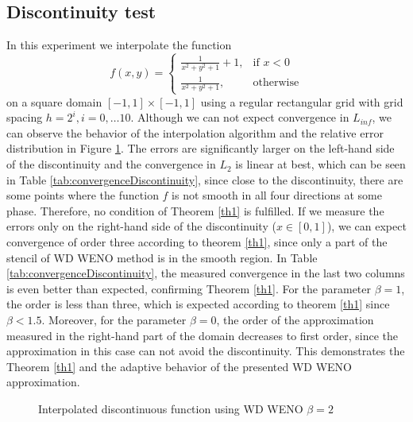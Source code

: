	\subsection{Discontinuity test}
 In this experiment we interpolate the function
 \begin{equation}
 	f(x,y)=
 	\begin{cases}
 		\frac{1}{x^2+y^2+1}+1,& \text{if } x < 0\\
 		\frac{1}{x^2+y^2+1}, & \text{otherwise}
 	\end{cases}
 \end{equation}
 on a square domain $[-1,1] \times [-1,1]$ using a regular rectangular grid with grid spacing $h=2^i, i=0,\ldots10$. Although we can not expect convergence in $L_{inf}$, we can observe the behavior of the interpolation algorithm and the relative error distribution in Figure \ref{figSurface}. The errors are significantly larger on the left-hand side of the discontinuity and the convergence in $L_{2}$ is linear at best, which can be seen in Table \ref{tab:convergenceDiscontinuity}, since close to the discontinuity, there are some points where the function $f$ is not smooth in all four directions at some phase. Therefore, no condition of Theorem \ref{th1} is fulfilled. If we measure the errors only on the right-hand side of the discontinuity ($x\in[0,1]$), we can expect convergence of order three according to theorem \ref{th1}, since only a part of the stencil of {WD} WENO method is in the smooth region. In Table \ref{tab:convergenceDiscontinuity}, the measured convergence in the last two columns is even better than expected, confirming Theorem \ref{th1}. For the parameter $\beta=1$, the order is less than three, which is expected according to theorem \ref{th1} since $\beta <1.5$. Moreover, for the parameter $\beta=0$, the order of the approximation measured in the right-hand part of the domain decreases to first order, since the approximation in this case can not avoid the discontinuity. This demonstrates the Theorem \ref{th1} and the adaptive behavior of the presented {WD} WENO approximation.
 
	\begin{figure}
	\centering
	\caption{Interpolated discontinuous function using {WD} WENO $\beta=2$}
	\label{figSurface}
	\end{figure}	
	
